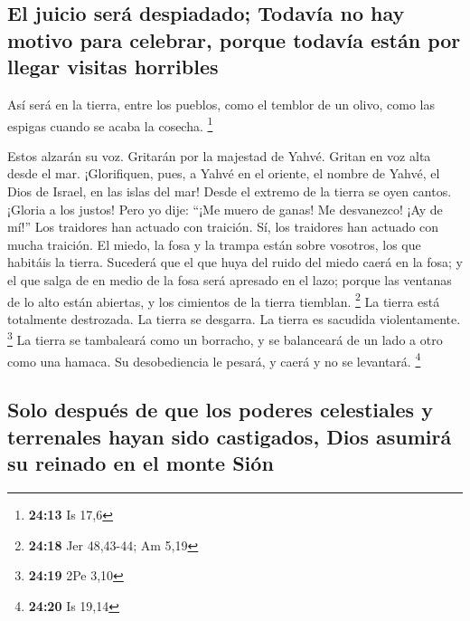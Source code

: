 \begin{paracol}{2}
\hypertarget{el-juicio-seruxe1-despiadado-todavuxeda-no-hay-motivo-para-celebrar-porque-todavuxeda-estuxe1n-por-llegar-visitas-horribles}{%
\subsection{El juicio será despiadado; Todavía no hay motivo para
celebrar, porque todavía están por llegar visitas
horribles}\label{el-juicio-seruxe1-despiadado-todavuxeda-no-hay-motivo-para-celebrar-porque-todavuxeda-estuxe1n-por-llegar-visitas-horribles}}

 Así será en la tierra, entre los pueblos, como el
temblor de un olivo, como las espigas cuando se acaba la cosecha.
\footnote{\textbf{24:13} Is 17,6}

 Estos alzarán su voz. Gritarán por la majestad de Yahvé.
Gritan en voz alta desde el mar.  ¡Glorifiquen, pues, a
Yahvé en el oriente, el nombre de Yahvé, el Dios de Israel, en las islas
del mar!  Desde el extremo de la tierra se oyen cantos.
¡Gloria a los justos! Pero yo dije: ``¡Me muero de ganas! Me desvanezco!
¡Ay de mí!'' Los traidores han actuado con traición. Sí, los traidores
han actuado con mucha traición.  El miedo, la fosa y la
trampa están sobre vosotros, los que habitáis la tierra. 
Sucederá que el que huya del ruido del miedo caerá en la fosa; y el que
salga de en medio de la fosa será apresado en el lazo; porque las
ventanas de lo alto están abiertas, y los cimientos de la tierra
tiemblan. \footnote{\textbf{24:18} Jer 48,43-44; Am 5,19}
 La tierra está totalmente destrozada. La tierra se
desgarra. La tierra es sacudida violentamente. \footnote{\textbf{24:19}
  2Pe 3,10}  La tierra se tambaleará como un borracho, y
se balanceará de un lado a otro como una hamaca. Su desobediencia le
pesará, y caerá y no se levantará. \footnote{\textbf{24:20} Is 19,14}

\hypertarget{solo-despuuxe9s-de-que-los-poderes-celestiales-y-terrenales-hayan-sido-castigados-dios-asumiruxe1-su-reinado-en-el-monte-siuxf3n}{%
\subsection{Solo después de que los poderes celestiales y terrenales
hayan sido castigados, Dios asumirá su reinado en el monte
Sión}\label{solo-despuuxe9s-de-que-los-poderes-celestiales-y-terrenales-hayan-sido-castigados-dios-asumiruxe1-su-reinado-en-el-monte-siuxf3n}}


\end{paracol}
